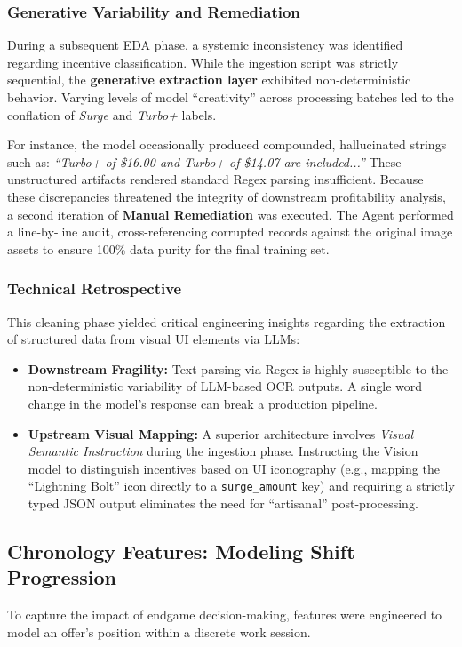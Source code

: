 \subsubsection{Generative Variability and Remediation}
During a subsequent EDA phase, a systemic inconsistency was identified regarding incentive classification. While the ingestion script was strictly sequential, the \textbf{generative extraction layer} exhibited non-deterministic behavior. Varying levels of model ``creativity'' across processing batches led to the conflation of \textit{Surge} and \textit{Turbo+} labels.

For instance, the model occasionally produced compounded, hallucinated strings such as: \textit{``Turbo+ of \$16.00 and Turbo+ of \$14.07 are included...''} These unstructured artifacts rendered standard Regex parsing insufficient. Because these discrepancies threatened the integrity of downstream profitability analysis, a second iteration of \textbf{Manual Remediation} was executed. The Agent performed a line-by-line audit, cross-referencing corrupted records against the original image assets to ensure 100\% data purity for the final training set.

\subsubsection{Technical Retrospective}
This cleaning phase yielded critical engineering insights regarding the extraction of structured data from visual UI elements via LLMs:
\begin{itemize}
    \item \textbf{Downstream Fragility:} Text parsing via Regex is highly susceptible to the non-deterministic variability of LLM-based OCR outputs. A single word change in the model's response can break a production pipeline.
    \item \textbf{Upstream Visual Mapping:} A superior architecture involves \textit{Visual Semantic Instruction} during the ingestion phase. Instructing the Vision model to distinguish incentives based on UI iconography (e.g., mapping the ``Lightning Bolt'' icon directly to a \texttt{surge\_amount} key) and requiring a strictly typed JSON output eliminates the need for ``artisanal'' post-processing.
\end{itemize}



\subsection{Chronology Features: Modeling Shift Progression}
To capture the impact of endgame decision-making, features were engineered to model an offer’s position within a discrete work session.

